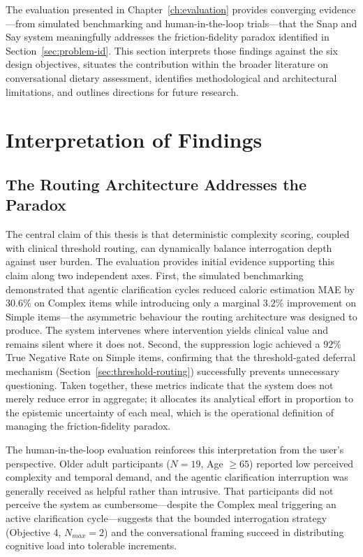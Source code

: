 The evaluation presented in Chapter~\ref{ch:evaluation} provides converging evidence---from simulated benchmarking and human-in-the-loop trials---that the Snap and Say system meaningfully addresses the friction-fidelity paradox identified in Section~\ref{sec:problem-id}. This section interprets those findings against the six design objectives, situates the contribution within the broader literature on conversational dietary assessment, identifies methodological and architectural limitations, and outlines directions for future research.

\section{Interpretation of Findings}

\subsection{The Routing Architecture Addresses the Paradox}

The central claim of this thesis is that deterministic complexity scoring, coupled with clinical threshold routing, can dynamically balance interrogation depth against user burden. The evaluation provides initial evidence supporting this claim along two independent axes. First, the simulated benchmarking demonstrated that agentic clarification cycles reduced caloric estimation MAE by $30.6\%$ on Complex items while introducing only a marginal $3.2\%$ improvement on Simple items---the asymmetric behaviour the routing architecture was designed to produce. The system intervenes where intervention yields clinical value and remains silent where it does not. Second, the suppression logic achieved a $92\%$ True Negative Rate on Simple items, confirming that the threshold-gated deferral mechanism (Section~\ref{sec:threshold-routing}) successfully prevents unnecessary questioning. Taken together, these metrics indicate that the system does not merely reduce error in aggregate; it allocates its analytical effort in proportion to the epistemic uncertainty of each meal, which is the operational definition of managing the friction-fidelity paradox.

The human-in-the-loop evaluation reinforces this interpretation from the user's perspective. Older adult participants ($N=19$, Age $\geq 65$) reported low perceived complexity and temporal demand, and the agentic clarification interruption was generally received as helpful rather than intrusive. That participants did not perceive the system as cumbersome---despite the Complex meal triggering an active clarification cycle---suggests that the bounded interrogation strategy (Objective 4, $N_{max}=2$) and the conversational framing succeed in distributing cognitive load into tolerable increments.

